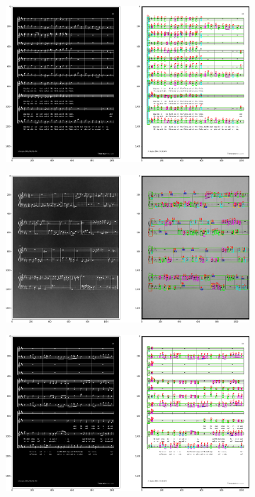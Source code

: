 \documentclass[12pt]{article}
\begin{document}
\begin{enumerate}
\begin{figure}[h!]
				\begin{subfigure}[b]{0.48\linewidth}
					\includegraphics[width=\linewidth]{Eazy/Zdj24.png}
				\end{subfigure}
				\begin{subfigure}[b]{0.48\linewidth}
					\includegraphics[width=\linewidth]{Eazy/Zdj25.png}
				\end{subfigure}
				\begin{subfigure}[b]{0.48\linewidth}
					\includegraphics[width=\linewidth]{Eazy/Zdj26.png}

\end{subfigure}
\end{figure}
\end{enumerate}
\end{document}

